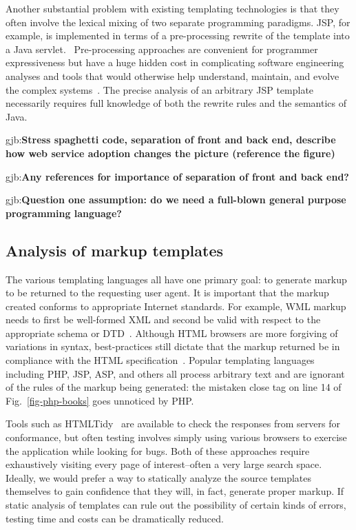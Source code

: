 \documentclass{www2003-submission}
\newcommand{\figref}[1]{Fig.~\ref{fig-#1}}
\newcommand{\gjb}[1]{{\sc gjb:}\textbf{#1}}
\begin{document}
Another substantial problem with existing templating technologies is
that they often involve the lexical mixing of two separate programming
paradigms.  JSP, for example, is implemented in terms of a
pre-processing rewrite of the template into a Java servlet.~\cite{JavaServlet}
Pre-processing approaches are convenient for programmer expressiveness
but have a huge hidden cost in complicating software engineering
analyses and tools that would otherwise help understand, maintain, and
evolve the complex systems~\cite{Badros00-spe,ErnstBadrosNotkin02}\cite[p.~424]{Stroustrup94}.
The precise analysis of an arbitrary JSP template necessarily requires
full knowledge of both the rewrite rules and the semantics of Java.

\gjb{Stress spaghetti code, separation of front and back end, describe
how web service adoption changes the picture (reference the figure)}

\gjb{Any references for importance of separation of front and back end?}

\gjb{Question one assumption: do we need a full-blown general purpose
programming language?}

\subsection{Analysis of markup templates}

The various templating languages all have one primary goal: to
generate markup to be returned to the requesting user agent.  It is
important that the markup created conforms to appropriate Internet
standards.  For example, WML markup needs to first be well-formed XML
and second be valid with respect to the appropriate
schema or DTD~\cite{WML}.  Although HTML browsers are more forgiving of
variations in syntax, best-practices still dictate that the markup returned
be in compliance with the HTML specification~\cite{HTML}.  
Popular templating languages including PHP, JSP, ASP, and others
all process arbitrary text and are ignorant of the rules of the markup
being generated: the mistaken close tag on line 14 of \figref{php-books}
goes unnoticed by PHP.

Tools such as HTMLTidy~\cite{HTMLTidy} are available to check the
responses from servers for conformance, but often testing involves
simply using various browsers to exercise the application while
looking for bugs.  Both of these approaches require exhaustively
visiting every page of interest--often a very large search space.
Ideally, we would prefer a way to statically analyze the source templates
themselves to gain confidence that they will, in fact, generate proper
markup.  If static analysis of templates can rule out the possibility
of certain kinds of errors, testing time and costs can be dramatically
reduced.
\end{document}
